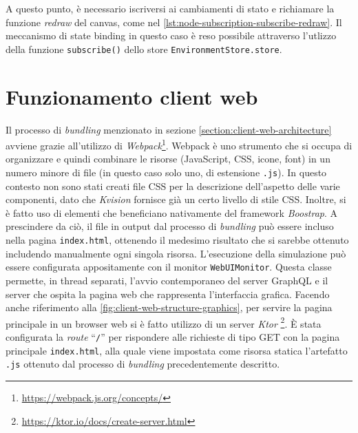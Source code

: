  A questo punto, è necessario iscriversi ai cambiamenti di stato e richiamare la funzione \textit{redraw} del canvas, come nel \cref{lst:node-subscription-subscribe-redraw}. Il meccanismo di state binding in questo caso è reso possibile attraverso l'utlizzo della funzione \texttt{subscribe()} dello store \texttt{EnvironmentStore.store}.

\section{Funzionamento client web}
Il processo di \textit{bundling} menzionato in sezione \ref{section:client-web-architecture} avviene grazie all'utilizzo di \textit{Webpack}\footnote{\url{https://webpack.js.org/concepts/}}. Webpack è uno strumento
che si occupa di organizzare e quindi combinare le risorse (JavaScript, CSS, icone, font) in un numero minore di file (in questo caso solo uno, di estensione \texttt{.js}). In questo contesto non sono stati creati file CSS per la descrizione dell'aspetto delle varie componenti, dato che \textit{Kvision} fornisce già un certo livello di stile CSS. Inoltre, si è fatto uso di elementi che beneficiano nativamente del framework \textit{Boostrap}. A prescindere da ciò, il file in output dal processo di \textit{bundling} può essere incluso nella pagina \texttt{index.html}, ottenendo il medesimo risultato che si sarebbe ottenuto includendo manualmente ogni singola risorsa.
L'esecuzione della simulazione può essere configurata appositamente con il monitor \texttt{WebUIMonitor}. Questa classe permette, in thread separati, l'avvio contemporaneo del server GraphQL e il server che ospita la pagina web che rappresenta l'interfaccia grafica.
Facendo anche riferimento alla \cref{fig:client-web-structure-graphics}, per servire la pagina principale in un browser web si è fatto utilizzo di un server \textit{Ktor} \footnote{\url{https://ktor.io/docs/create-server.html}}.
È stata configurata la \textit{route} ``\texttt{/}'' per rispondere alle richieste di tipo GET con la pagina principale \texttt{index.html}, alla quale viene impostata come risorsa statica l'artefatto \texttt{.js} ottenuto dal processo di \textit{bundling} precedentemente descritto.
